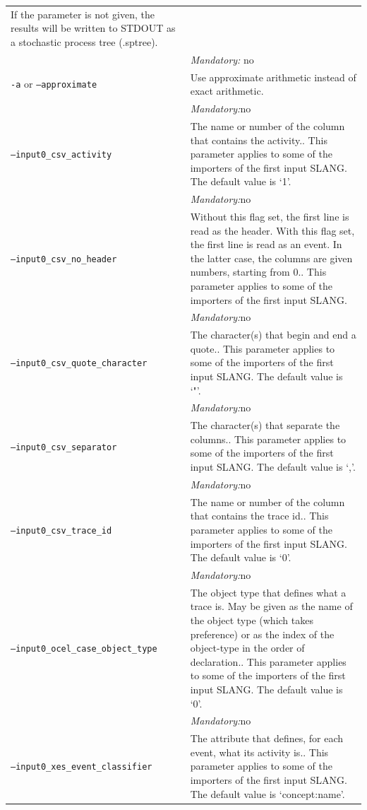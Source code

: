 {\begin{tabularx}{\linewidth}{lX}
If the parameter is not given, the results will be written to STDOUT as a stochastic process tree (.sptree).\\
&\textit{Mandatory:} \quad no\\
\texttt{-a} or \texttt{--approximate} & Use approximate arithmetic instead of exact arithmetic.\\
&\textit{Mandatory:}\quad no\\
\texttt{--input0\_csv\_activity} & The name or number of the column that contains the activity.. This parameter applies to some of the importers of the first input SLANG. The default value is `1'.\\
&\textit{Mandatory:}\quad no\\
\texttt{--input0\_csv\_no\_header} & Without this flag set, the first line is read as the header. 
    With this flag set, the first line is read as an event. In the latter case, the columns are given numbers, starting from 0.. This parameter applies to some of the importers of the first input SLANG. \\
&\textit{Mandatory:}\quad no\\
\texttt{--input0\_csv\_quote\_character} & The character(s) that begin and end a quote.. This parameter applies to some of the importers of the first input SLANG. The default value is `"'.\\
&\textit{Mandatory:}\quad no\\
\texttt{--input0\_csv\_separator} & The character(s) that separate the columns.. This parameter applies to some of the importers of the first input SLANG. The default value is `,'.\\
&\textit{Mandatory:}\quad no\\
\texttt{--input0\_csv\_trace\_id} & The name or number of the column that contains the trace id.. This parameter applies to some of the importers of the first input SLANG. The default value is `0'.\\
&\textit{Mandatory:}\quad no\\
\texttt{--input0\_ocel\_case\_object\_type} & The object type that defines what a trace is. May be given as the name of the object type (which takes preference) or as the index of the object-type in the order of declaration.. This parameter applies to some of the importers of the first input SLANG. The default value is `0'.\\
&\textit{Mandatory:}\quad no\\
\texttt{--input0\_xes\_event\_classifier} & The attribute that defines, for each event, what its activity is.. This parameter applies to some of the importers of the first input SLANG. The default value is `concept:name'.\\

\end{tabularx}}
